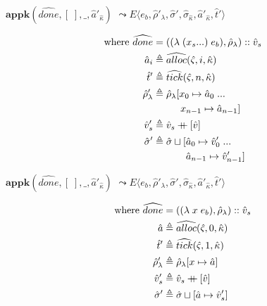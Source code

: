 \documentclass[12pt,draft]{article}
\newcommand\mdoubleplus{\ensuremath{\mathbin{+\mkern-9mu+}}}
\newcommand{\lamsyn}[2]{(\lambda\;(#1 ...)\;#2)}
\newcommand{\vararglamsyn}[2]{(\lambda\;#1\;#2)}
\begin{document}
\begin{multicols*}{2}
\begin{center}
  $\textbf{appk}(\widehat{done}, [\;], \_, \hat{a}'_{\hat{\kappa}})$
  $\leadsto E\langle e_b , \hat{\rho}'_\lambda , \hat{\sigma}' , \hat{\sigma}_{\hat{\kappa}} , \hat{a}'_{\hat{\kappa}} , \hat{t}'\rangle$
\end{center}
\vspace{-7mm}
\begin{align*}
  \text{where } \widehat{done} &= (\lamsyn{x_s}{e_b}, \hat{\rho}_{\lambda}) :: \hat{v}_s \\
  \hat{a}_i &\triangleq \widehat{alloc}(\hat{\varsigma}, i, \hat{\kappa}) \\
  \hat{t}' &\triangleq \widehat{tick}(\hat{\varsigma}, n, \hat{\kappa}) \\
  \hat{\rho}'_{\lambda} &\triangleq \hat{\rho}_{\lambda}[x_0 \mapsto \hat{a}_0 \;... \\
  &\;\;\;\;\;\;\;\;\;\;x_{n-1} \mapsto \hat{a}_{n-1}] \\
  \hat{v}'_s &\triangleq \hat{v}_s \mdoubleplus [\hat{v}] \\
  \hat{\sigma}' &\triangleq \hat{\sigma} \sqcup
                  [\hat{a}_0 \mapsto \hat{v}'_0\;...\\
  &\;\;\;\;\;\;\;\;\;\;\;\;\hat{a}_{n-1} \mapsto \hat{v}'_{n-1}]
\end{align*}
\begin{center}
  $\textbf{appk}(\widehat{done}, [\;], \_, \hat{a}'_{\hat{\kappa}})$
  $\leadsto E\langle e_b, \hat{\rho}'_\lambda , \hat{\sigma}' , \hat{\sigma}_{\hat{\kappa}} , \hat{a}'_{\hat{\kappa}} , \hat{t}'\rangle$
\end{center}
\vspace{-7mm}
\begin{align*}
\text{where } \widehat{done} &= (\vararglamsyn{x}{e_b}, \hat{\rho}_{\lambda}) :: \hat{v}_s \\
  \hat{a} &\triangleq \widehat{alloc}(\hat{\varsigma}, 0, \hat{\kappa}) \\
  \hat{t}' &\triangleq \widehat{tick}(\hat{\varsigma}, 1, \hat{\kappa}) \\
  \hat{\rho}'_{\lambda} &\triangleq \hat{\rho}_{\lambda}[x \mapsto \hat{a}] \\
  \hat{v}'_s &\triangleq \hat{v}_s \mdoubleplus [\hat{v}] \\
  \hat{\sigma}' &\triangleq \hat{\sigma} \sqcup
                  [\hat{a} \mapsto \hat{v}'_s]

\end{align*}
\end{multicols*}
\end{document}
